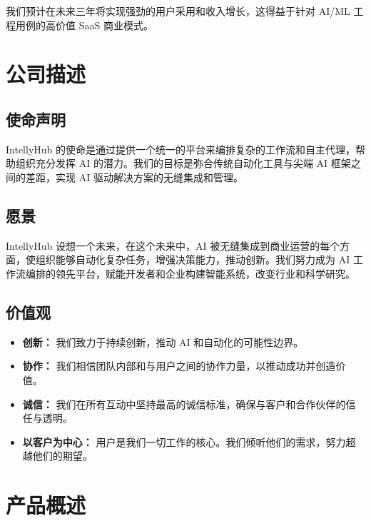 \documentclass[11pt, a4paper, oneside]{article}
\begin{document}
我们预计在未来三年将实现强劲的用户采用和收入增长，这得益于针对 AI/ML 工程用例的高价值 SaaS 商业模式。

\section{公司描述}
\subsection{使命声明}
IntellyHub 的使命是通过提供一个统一的平台来编排复杂的工作流和自主代理，帮助组织充分发挥 AI 的潜力。我们的目标是弥合传统自动化工具与尖端 AI 框架之间的差距，实现 AI 驱动解决方案的无缝集成和管理。

\subsection{愿景}
IntellyHub 设想一个未来，在这个未来中，AI 被无缝集成到商业运营的每个方面，使组织能够自动化复杂任务，增强决策能力，推动创新。我们努力成为 AI 工作流编排的领先平台，赋能开发者和企业构建智能系统，改变行业和科学研究。

\subsection{价值观}
\begin{itemize}
    \item \textbf{创新：} 我们致力于持续创新，推动 AI 和自动化的可能性边界。
    \item \textbf{协作：} 我们相信团队内部和与用户之间的协作力量，以推动成功并创造价值。
    \item \textbf{诚信：} 我们在所有互动中坚持最高的诚信标准，确保与客户和合作伙伴的信任与透明。
    \item \textbf{以客户为中心：} 用户是我们一切工作的核心。我们倾听他们的需求，努力超越他们的期望。
\end{itemize}


\section{产品概述}


\end{document}
